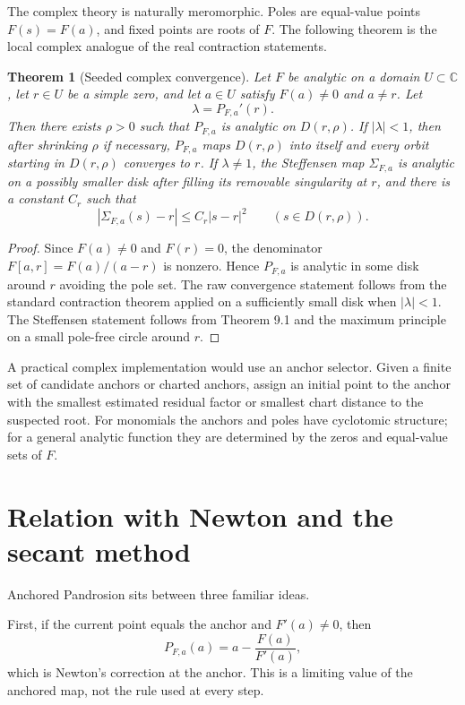 \documentclass[11pt]{article}
\newtheorem{theorem}{Theorem}[section]
\theoremstyle{definition}
\newcommand{\C}{\mathbb{C}}
\begin{document}
The complex theory is naturally meromorphic.  Poles are equal-value points $F(s)=F(a)$, and fixed points are roots of $F$.  The following theorem is the local complex analogue of the real contraction statements.

\begin{theorem}[Seeded complex convergence]
Let $F$ be analytic on a domain $U\subset\C$, let $r\in U$ be a simple zero, and let $a\in U$ satisfy $F(a)\ne0$ and $a\ne r$.  Let
\[
        \lambda=P_{F,a}'(r).
\]
Then there exists $\rho>0$ such that $P_{F,a}$ is analytic on $D(r,\rho)$.
If $|\lambda|<1$, then after shrinking $\rho$ if necessary, $P_{F,a}$ maps $D(r,\rho)$ into itself and every orbit starting in $D(r,\rho)$ converges to $r$.
If $\lambda\ne1$, the Steffensen map $\Sigma_{F,a}$ is analytic on a possibly smaller disk after filling its removable singularity at $r$, and there is a constant $C_r$ such that
\[
        |\Sigma_{F,a}(s)-r|\le C_r|s-r|^2
        \qquad (s\in D(r,\rho)).
\]
\end{theorem}

\begin{proof}
Since $F(a)\ne0$ and $F(r)=0$, the denominator $F[a,r]=F(a)/(a-r)$ is nonzero.  Hence $P_{F,a}$ is analytic in some disk around $r$ avoiding the pole set.  The raw convergence statement follows from the standard contraction theorem applied on a sufficiently small disk when $|\lambda|<1$.  The Steffensen statement follows from Theorem 9.1 and the maximum principle on a small pole-free circle around $r$.
\end{proof}

A practical complex implementation would use an anchor selector.  Given a finite set of candidate anchors or charted anchors, assign an initial point to the anchor with the smallest estimated residual factor or smallest chart distance to the suspected root.  For monomials the anchors and poles have cyclotomic structure; for a general analytic function they are determined by the zeros and equal-value sets of $F$.

\section{Relation with Newton and the secant method}

Anchored Pandrosion sits between three familiar ideas.

First, if the current point equals the anchor and $F'(a)\ne0$, then
\[
        P_{F,a}(a)=a-\frac{F(a)}{F'(a)},
\]
which is Newton's correction at the anchor.  This is a limiting value of the anchored map, not the rule used at every step.
\end{document}

